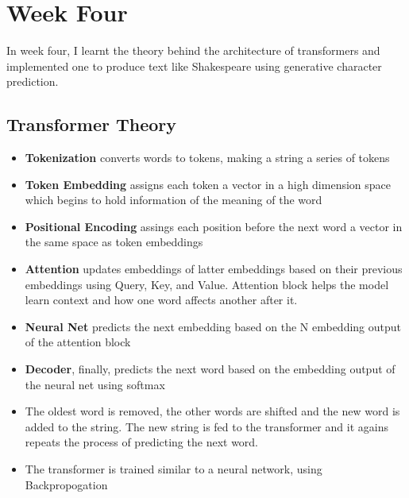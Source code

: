 \documentclass[12pt,a4paper]{article}
\begin{document}
\section{Week Four}
In week four, I learnt the theory behind the architecture of transformers and implemented one to produce text like Shakespeare using generative character prediction. 
\subsection{Transformer Theory}
\begin{itemize}
\item \textbf{Tokenization} converts words to tokens, making a string a series of tokens
\item \textbf{Token Embedding} assigns each token a vector in a high dimension space which begins to hold information of the meaning of the word
\item \textbf{Positional Encoding} assings each position before the next word a vector in the same space as token embeddings
\item \textbf{Attention} updates embeddings of latter embeddings based on their previous embeddings using Query, Key, and Value. Attention block helps the model learn context and how one word affects another after it.
\item \textbf{Neural Net} predicts the next embedding based on the N embedding output of the attention block
\item \textbf{Decoder}, finally, predicts the next word based on the embedding output of the neural net using softmax
\item The oldest word is removed, the other words are shifted and the new word is added to the string. The new string is fed to the transformer and it agains repeats the process of predicting the next word.
\item The transformer is trained similar to a neural network, using Backpropogation 
\end{itemize}
\end{document}
